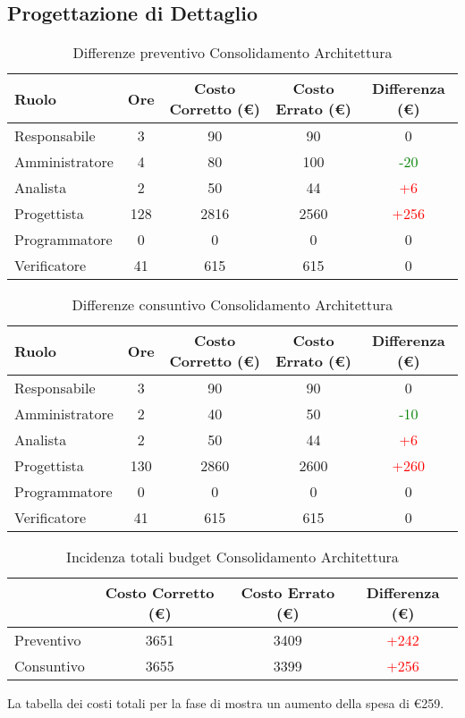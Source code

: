 \subsection{Progettazione di Dettaglio}
\begin{table}[h]
\begin{center}
\begin{tabular}{|l|c|c|c|c|}
\hline Ruolo & Ore & Costo Corretto (\euro) & Costo Errato (\euro) & Differenza (\euro) \\
\hline
Responsabile & 3 & 90  & 90 & 0\\
Amministratore & 4 & 80 & 100 & \textcolor{Green}{-20}\\
Analista &  2 & 50 & 44 & \textcolor{red}{+6}\\
Progettista & 128 & 2816 & 2560 & \textcolor{red}{+256}\\
Programmatore & 0 & 0 & 0 & 0\\
Verificatore & 41 & 615 & 615 & 0\\
\hline
\end{tabular}
\caption{Differenze preventivo Consolidamento Architettura}
\end{center}
\end{table}
\FloatBarrier
\begin{table}[h]
\begin{center}
\begin{tabular}{|l|c|c|c|c|}
\hline Ruolo & Ore & Costo Corretto (\euro) & Costo Errato (\euro) & Differenza (\euro)\\
\hline
Responsabile & 3 & 90 & 90 & 0\\
Amministratore & 2 & 40 & 50 & \textcolor{Green}{-10}\\
Analista & 2 & 50 & 44 & \textcolor{red}{+6}\\
Progettista & 130 & 2860 & 2600 & \textcolor{red}{+260}\\
Programmatore & 0 & 0 & 0 & 0\\
Verificatore & 41 & 615 & 615 & 0\\
\hline
\end{tabular}
\caption{Differenze consuntivo Consolidamento Architettura}
\end{center}
\end{table}
\FloatBarrier
\begin{table}[h]
\begin{center}
\begin{tabular}{|l|c|c|c|}
\hline & Costo Corretto (\euro) & Costo Errato (\euro) & Differenza (\euro)\\
\hline
Preventivo & 3651 & 3409& \textcolor{red}{+242}\\
Consuntivo & 3655 & 3399& \textcolor{red}{+256}\\
\hline
\end{tabular}
\caption{Incidenza totali budget Consolidamento Architettura}
\end{center}
\end{table}
\FloatBarrier
La tabella dei costi totali per la fase di \fPD mostra un aumento della spesa di \euro259.
\newpage
